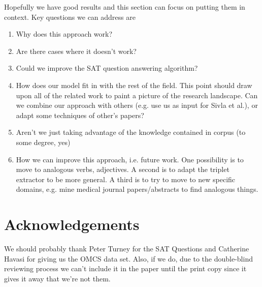 \documentclass[11pt]{article}
\begin{document}
Hopefully we have good results and this section can focus on putting them in
context.  Key questions we can address are
\begin{enumerate}
  \item Why does this approach work?
  \item Are there cases where it doesn't work?
  \item Could we improve the SAT question answering algorithm?
  \item How does our model fit in with the rest of the field.  This point should
    draw upon all of the related work to paint a picture of the research
    landscape.  Can we combine our approach with others (e.g. use us as input
    for Sivla et al.), or adapt some techniques of other's papers?
  \item Aren't we just taking advantage of the knowledge contained in corpus (to
    some degree, yes)
  \item How we can improve this approach, i.e. future work.  One possibility is
    to move to analogous verbs, adjectives.  A second is to adapt the triplet
    extractor to be more general.  A third is to try to move to new specific
    domains, e.g. mine medical journal papers/abstracts to find analogous
    things.
\end{enumerate}

\section{Acknowledgements}

We should probably thank Peter Turney for the SAT Questions and Catherine Havasi
for giving us the OMCS data set.  Also, if we do, due to the double-blind
reviewing process we can't include it in the paper until the print copy since it
gives it away that we're not them.



\end{document}

